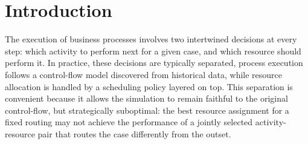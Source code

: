 \documentclass[runningheads]{llncs}
\begin{document}
\begin{abstract}
\end{abstract}

\section{Introduction}
\label{sec:introduction}

The execution of business processes involves two intertwined decisions at every step: which activity to perform next for a given case, and which resource should perform it. In practice, these decisions are typically separated, process execution follows a control-flow model discovered from historical data, while resource allocation is handled by a scheduling policy layered on top. This separation is convenient because it allows the simulation to remain faithful to the original control-flow, but strategically suboptimal: the best resource assignment for a fixed routing may not achieve the performance of a jointly selected activity-resource pair that routes the case differently from the outset.
\end{document}
